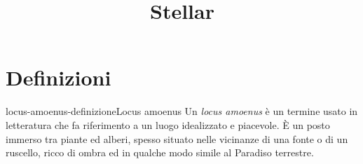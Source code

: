 \documentclass[preview]{standalone}
\begin{document}
\title{Stellar}
\genpage

\section{Definizioni}

\begin{snippetdefinition}{locus-amoenus-definizione}{Locus amoenus}
    Un \textit{locus amoenus} è un termine usato in letteratura
    che fa riferimento a un luogo idealizzato e piacevole.
    È un posto immerso tra piante ed alberi,
    spesso situato nelle vicinanze di una fonte o di un ruscello,
    ricco di ombra ed in qualche modo simile al Paradiso terrestre. 
\end{snippetdefinition}
\end{document}
